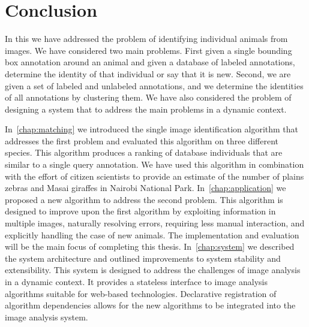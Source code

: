 \begin{comment}
    ./texfix.py --fpaths chapter6-conclusion.tex --outline --asmarkdown --numlines=99 -w
\end{comment}

\chapter{Conclusion}\label{chap:conclusion} %

    In this \thesis{} we have addressed the problem of identifying individual
      animals from images.
    We have considered two main problems.
    First given a single bounding box annotation around an animal and given a
      database of labeled annotations, determine the identity of that individual
      or say that it is new.
    Second, we are given a set of labeled and unlabeled annotations, and we
      determine the identities of all annotations by clustering them.
    We have also considered the problem of designing a system that to address
      the main problems in a dynamic context.

    In~\cref{chap:matching} we introduced the single image identification
      algorithm that addresses the first problem and evaluated this algorithm on
      three different species.
    This algorithm produces a ranking of database individuals that are similar
      to a single query annotation.
    We have used this algorithm in combination with the effort of citizen
      scientists to provide an estimate of the number of plains zebras and Masai
      giraffes in Nairobi National Park.
    In~\cref{chap:application} we proposed a new algorithm to address the
      second problem.
    This algorithm is designed to improve upon the first algorithm by
      exploiting information in multiple images, naturally resolving errors,
      requiring less manual interaction, and explicitly handling the case of new
      animals.
    The implementation and evaluation will be the main focus of completing
      this thesis.
    In~\cref{chap:system} we described the system architecture and outlined
      improvements to system stability and extensibility.
    This system is designed to address the challenges of image analysis in a
      dynamic context.
    It provides a stateless interface to image analysis algorithms suitable
      for web-based technologies.
    Declarative registration of algorithm dependencies allows for the new
      algorithms to be integrated into the image analysis system.

